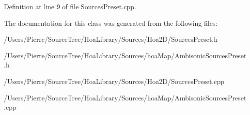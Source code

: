 Definition at line 9 of file Sources\-Preset.\-cpp.



The documentation for this class was generated from the following files\-:\begin{DoxyCompactItemize}
\item 
/\-Users/\-Pierre/\-Source\-Tree/\-Hoa\-Library/\-Sources/\-Hoa2\-D/Sources\-Preset.\-h\item 
/\-Users/\-Pierre/\-Source\-Tree/\-Hoa\-Library/\-Sources/hoa\-Map/Ambisonic\-Sources\-Preset.\-h\item 
/\-Users/\-Pierre/\-Source\-Tree/\-Hoa\-Library/\-Sources/\-Hoa2\-D/Sources\-Preset.\-cpp\item 
/\-Users/\-Pierre/\-Source\-Tree/\-Hoa\-Library/\-Sources/hoa\-Map/Ambisonic\-Sources\-Preset.\-cpp\end{DoxyCompactItemize}
